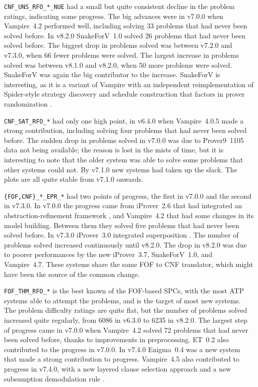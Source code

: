 \documentclass[runningheads]{llncs}
\begin{document}
{\tt CNF\_UNS\_RFO\_*\_NUE} had a small but quite consistent decline in the problem ratings, 
indicating some progress.
The big advances were in v7.0.0 when Vampire~4.2 performed well, including solving 33 problems
that had never been solved before.
In v8.2.0 SnakeForV~1.0 solved 26 problems that had never been solved before.
The biggest drop in problems solved was between v7.2.0 and v7.3.0, when 66 fewer problems were
solved.
The largest increase in problems solved was between v8.1.0 and v8.2.0, when 50 more problems
were solved.
SnakeForV was again the big contributor to the increase.
SnakeForV is interesting, as it is a variant of Vampire with an independent reimplementation of 
Spider-style \cite{Vor23} strategy discovery and schedule construction that factors in prover 
randomization \cite{Sud22}.

{\tt CNF\_SAT\_RFO\_*} had only one high point, in v6.4.0 when Vampire~4.0.5 made a strong
contribution, including solving four problems that had never been solved before.
The sudden drop in problems solved in v7.0.0 was due to Prover9~1105 \cite{McC-Prover9-URL}
data not being available; the reason is lost in the mists of time, but it is interesting to note 
that the older system was able to solve some problems that other systems could not.
By v7.1.0 new systems had taken up the slack.
The plots are all quite stable from v7.1.0 onwards.

{\tt \{FOF,CNF\}\_*\_EPR\_*} had two points of progress, the first in v7.0.0 and the second in
v7.3.0.
In v7.0.0 the progress came from iProver~2.6 that had integrated an abstraction-refinement 
framework \cite{HK17}, and Vampire~4.2 that had some changes in its model building.
Between them they solved five problems that had never been solved before.
In v7.3.0 iProver~3.0 integrated superposition \cite{DK20}.
The number of problems solved increased continuously until v8.2.0. 
The drop in v8.2.0 
was due to poorer performances by the new iProver~3.7, SnakeForV~1.0, and Vampire~4.7.
These systems share the same FOF to CNF translator, which might have been the source of the
common change.

{\tt FOF\_THM\_RFO\_*} is the best known of the FOF-based SPCs, with the most ATP systems able 
to attempt the problems, and is the target of most new systems.
The problem difficulty ratings are quite flat, but the number of problems solved increased quite 
regularly, from 6086 in v6.3.0 to 6235 in v8.2.0.
The largest step of progress came in v7.0.0 when Vampire~4.2 solved 72 problems that had never 
been solved before, thanks to improvements in preprocessing.
ET~0.2 \cite{KS+15} also contributed to the progress in v7.0.0.
In v7.4.0 Enigma~0.4 \cite{JU17,JC+20} was a new system that made a strong contribution to 
progress.
Vampire~4.5 also contributed to progress in v7.4.0, with a new layered clause selection approach 
\cite{GS20} and a new subsumption demodulation rule \cite{GKR20}.
\end{document}
